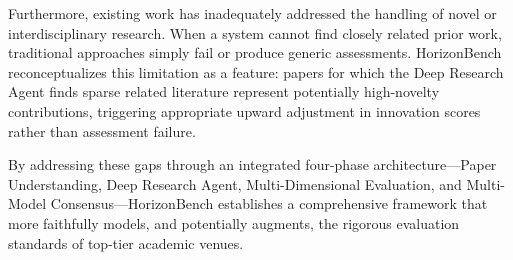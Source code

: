 Furthermore, existing work has inadequately addressed the handling of novel or interdisciplinary research. When a system cannot find closely related prior work, traditional approaches simply fail or produce generic assessments. HorizonBench reconceptualizes this limitation as a feature: papers for which the Deep Research Agent finds sparse related literature represent potentially high-novelty contributions, triggering appropriate upward adjustment in innovation scores rather than assessment failure.

By addressing these gaps through an integrated four-phase architecture—Paper Understanding, Deep Research Agent, Multi-Dimensional Evaluation, and Multi-Model Consensus—HorizonBench establishes a comprehensive framework that more faithfully models, and potentially augments, the rigorous evaluation standards of top-tier academic venues.
